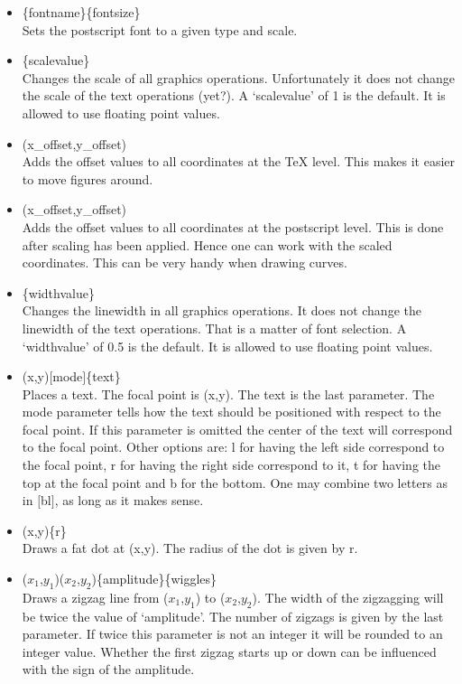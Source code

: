\begin{itemize}
    current picture. In addition it does not affect the text commands that 
    write in \TeX{} mode. Also the commands that draw gray boxes are not 
    affected. For influencing the color of the \TeX{} or \LaTeX{} output 
    one can use the commands mentioned in the colordvi.sty file.
\item {}\{fontname\}\{fontsize\} \hfill \\
    Sets the postscript font to a given type and scale.
\item {}\{scalevalue\} \hfill \\
    Changes the scale of all graphics operations. Unfortunately it does 
    not change the scale of the text operations (yet?). A `scalevalue' of 
    1 is the default. It is allowed to use floating point values.
\item {}(x\_offset,y\_offset) \hfill \\
    Adds the offset values to all coordinates at the \TeX{} level. This 
    makes it easier to move figures around.
\item {}(x\_offset,y\_offset) \hfill \\
    Adds the offset values to all coordinates at the postscript level. 
    This is done after scaling has been applied. Hence one can work with 
    the scaled coordinates. This can be very handy when drawing curves.
\item {}\{widthvalue\} \hfill \\
    Changes the linewidth in all graphics operations. It does 
    not change the linewidth of the text operations. That is a matter of 
    font selection. A `widthvalue' of 
    0.5 is the default. It is allowed to use floating point values.
\item {}(x,y)$[$mode$]$\{text\} \hfill \\
    Places a text. The focal point is (x,y). The text is the last 
    parameter. The mode parameter tells how the text should be 
    positioned with respect to the focal point. If this parameter is 
    omitted the center of the text will correspond to the focal point. 
    Other options are: l for having the left side correspond to the 
    focal point, r for having the right side correspond to it, t for 
    having the top at the focal point and b for the bottom. One may 
    combine two letters as in $[$bl$]$, as long as it makes sense.
\item {}(x,y)\{r\} \hfill \\
    Draws a fat dot at (x,y). The radius of the dot is given by r.
\item {}($x_1$,$y_1$)($x_2$,$y_2$)\{amplitude\}\{wiggles\} \hfill \\
    Draws a zigzag line from ($x_1$,$y_1$) to ($x_2$,$y_2$). The width of the 
    zigzagging will be twice the value of `amplitude'. The number of zigzags 
    is given by the last parameter. If twice this parameter is not an integer 
    it will be rounded to an integer value. Whether the first zigzag 
    starts up or down can be influenced with the sign of the amplitude.
\end{itemize}


